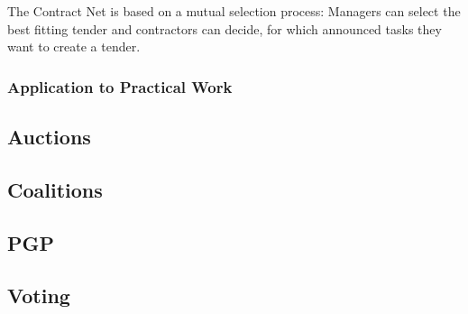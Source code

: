 The Contract Net is based on a mutual selection process: Managers can select the best fitting tender and contractors can decide, for which announced tasks they want to create a tender.  

\subsubsection*{Application to Practical Work}

\subsection{Auctions}

\subsection{Coalitions}

\subsection{PGP}

\subsection{Voting}

